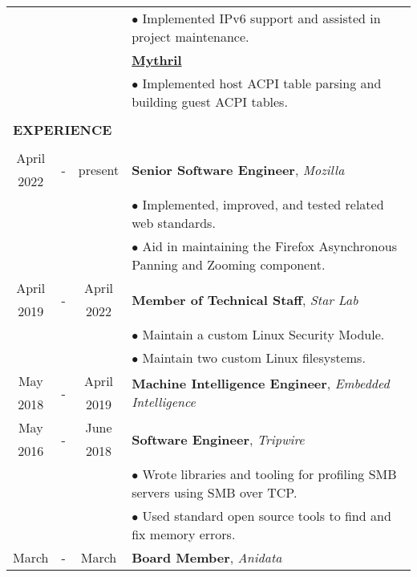 \documentclass[10pt]{article}
\begin{document}
\begin{table}[ht]
\begin{tabular}{@{\hspace{0mm}}c@{\hspace{1mm}}c@{\hspace{3mm}}cl}
            & & & $\bullet$ Implemented IPv6 support and assisted in project maintenance.\\[2mm]
            & & & \textbf{\href{https://github.com/mythril-hypervisor/mythril}{Mythril}}\\
            & & & $\bullet$ Implemented host ACPI table parsing and building guest ACPI tables.\\[2mm]
            \hline\\[-3mm]
            \multicolumn{4}{l}{\large{\textbf{EXPERIENCE}}}\\
            \hline\\[-2mm]
            April & \multirow{2}{*}{-} & \multirow{2}{*}{present} & \multirow{2}{*}{\textbf{Senior Software Engineer}, \textit{Mozilla}}\\
            2022 & & &\\
            & & & $\bullet$ Implemented, improved, and tested related web standards.\\
            & & & $\bullet$ Aid in maintaining the Firefox Asynchronous Panning and Zooming component.\\
            April & \multirow{2}{*}{-} & April & \multirow{2}{*}{\textbf{Member of Technical Staff}, \textit{Star Lab}}\\
            2019 & & 2022 &\\
            & & & $\bullet$ Maintain a custom Linux Security Module.\\
            & & & $\bullet$ Maintain two custom Linux filesystems.\\
            May & \multirow{2}{*}{-} & April & \multirow{2}{*}{\textbf{Machine Intelligence Engineer}, \textit{Embedded Intelligence}}\\
            2018 & & 2019 &\\
            May & \multirow{2}{*}{-} & June & \multirow{2}{*}{\textbf{Software Engineer}, \textit{Tripwire}}\\
            2016 & & 2018 &\\
            & & & $\bullet$ Wrote libraries and tooling for profiling SMB servers using SMB over TCP.\\
            & & & $\bullet$ Used standard open source tools to find and fix memory errors.\\
            March & \multirow{2}{*}{-} & March & \multirow{2}{*}{\textbf{Board Member}, \textit{Anidata}}\\

\end{tabular}
\end{table}
\end{document}
